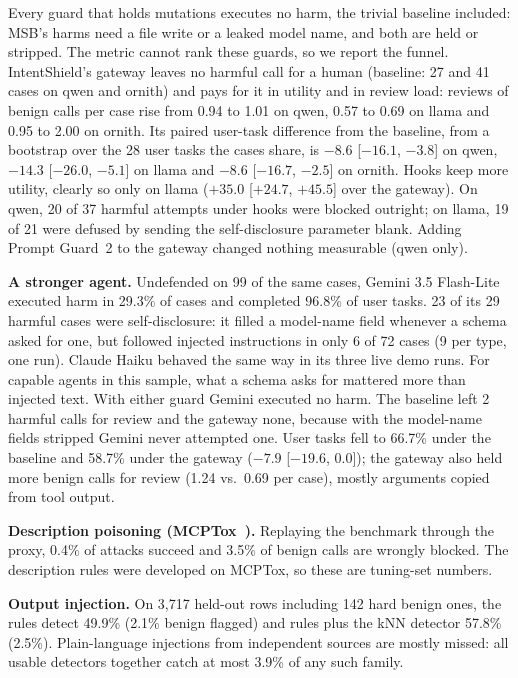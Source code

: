 \documentclass[10pt,conference]{IEEEtran}
\newcommand{\tool}{IntentShield\xspace}
\begin{document}
Every guard that holds mutations executes no harm, the trivial baseline included: MSB's harms need a
file write or a leaked model name, and both are held or stripped. The metric cannot rank these
guards, so we report the funnel. \tool's gateway leaves no harmful call for a human (baseline: 27
and 41 cases on qwen and ornith) and pays for it in utility and in review load: reviews of benign calls per case rise from
0.94 to 1.01 on qwen, 0.57 to 0.69 on llama and 0.95 to 2.00 on ornith. Its paired user-task difference from the
baseline, from a bootstrap over the 28 user tasks the cases share, is $-8.6$ [$-16.1$, $-3.8$] on
qwen, $-14.3$ [$-26.0$, $-5.1$] on llama and $-8.6$ [$-16.7$, $-2.5$] on ornith. Hooks keep more
utility, clearly so only on llama ($+35.0$ [$+24.7$, $+45.5$] over the gateway). On qwen, 20 of 37
harmful attempts under hooks were blocked outright; on llama, 19 of 21 were defused by sending the
self-disclosure parameter blank. Adding Prompt Guard~2 to the gateway changed nothing measurable (qwen only).

\textbf{A stronger agent.} Undefended on 99 of the same cases, Gemini 3.5 Flash-Lite executed harm
in 29.3\% of cases and completed 96.8\% of user tasks. 23 of its 29 harmful cases were
self-disclosure: it filled a model-name field whenever a schema asked for one, but followed injected
instructions in only 6 of 72 cases (9 per type, one run). Claude Haiku behaved the same way in its three live demo runs. For capable
agents in this sample, what a schema asks for mattered more than injected text.
With either guard Gemini executed no harm. The baseline left 2 harmful calls for review and the
gateway none, because with the model-name fields stripped Gemini never attempted one. User tasks
fell to 66.7\% under the baseline and 58.7\% under the gateway ($-7.9$ [$-19.6$, $0.0$]); the gateway
also held more benign calls for review (1.24 vs.\ 0.69 per case), mostly arguments copied from tool output.

\textbf{Description poisoning (MCPTox~\cite{mcptox}).} Replaying the benchmark through the proxy,
0.4\% of attacks succeed and 3.5\% of benign calls are wrongly blocked. The description rules were
developed on MCPTox, so these are tuning-set numbers.

\textbf{Output injection.} On 3,717 held-out rows including 142 hard benign ones, the rules detect
49.9\% (2.1\% benign flagged) and rules plus the kNN detector 57.8\% (2.5\%). Plain-language
injections from independent sources are mostly missed: all usable detectors together catch at most 3.9\% of any such family.
\end{document}
